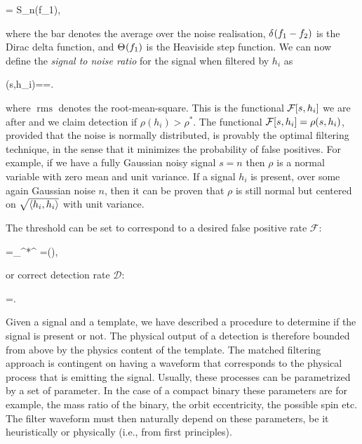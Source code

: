 \documentclass[
  11pt,
  a4paper,
  DIV=11,
  numbers=noendperiod,
  oneside]{scrreprt}
\let\[\relax \let\]\relax %
\DeclareRobustCommand{\[}{\begin{equation}}
\DeclareRobustCommand{\]}{\end{equation}}
\begin{document}
\[
=\half {} S_n(f_1),
\]

where the bar denotes the average over the noise realisation,
\(\delta^{{}}(f_1-f_2)\) is the Dirac delta function, and \(\Theta^{{}}(f_1)\)
is the Heaviside step function. We can now define the \emph{signal to
noise ratio} for the signal when filtered by \(h_i\) as 

\[
\rho (s,h_i)==.
\]

where \(\operatorname{rms}\) denotes the root-mean-square. This is the
functional \(\mathcal{F}[s,h_i ]\) we are after and we claim
detection if \(\rho(h_i)>\rho^*\). The functional
\(\mathcal{F}[s,h_i ]=\rho (s,h_i)\), provided that the noise is
normally distributed, is provably the optimal filtering technique, in
the sense that it minimizes the probability of false positives. For
example, if we have a fully Gaussian noisy signal \(s=n\) then \(\rho\)
is a normal variable with zero mean and unit variance. If a signal
\(h_i\) is present, over some again Gaussian noise \(n\), then it can be
proven that \(\rho\) is still normal but centered on
\(\sqrt{\langle h_i,h_i \rangle}\) with unit variance.

The threshold can be set to correspond to a desired false positive rate
\(\mathcal{F}\):

\[=\sqrt{\inv{2\pi}}\int\limits_{\rho^*}^{\infty} \dd{\rho}=\half {}(),\]

or correct detection rate \(\mathcal{D}\):

\[
=\Half{}.  
\]

Given a signal and a template, we have described a procedure to
determine if the signal is present or not. The physical output of a
detection is therefore bounded from above by the physics content of the
template. The matched filtering approach is contingent on having a
waveform that corresponds to the physical process that is emitting the
signal. Usually, these processes can be parametrized by a set of
parameter. In the case of a compact binary these parameters are for
example, the mass ratio of the binary, the orbit eccentricity, the
possible spin etc. The filter waveform must then naturally depend on
these parameters, be it heuristically or physically (i.e., from first
principles).
\end{document}
